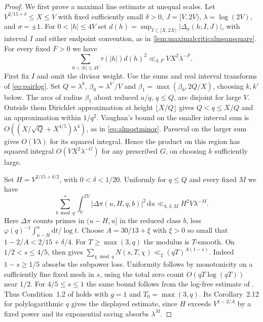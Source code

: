 \documentclass[11pt,a4paper]{article}
\numberwithin{equation}{section}
\newcommand{\ud}{\mathrm d}
\begin{document}
\begin{proof}
We first prove a maximal line estimate at unequal scales. Let
$V^{2/15+\delta}\le X\le V$ with fixed sufficiently small $\delta>0$,
$J=[V,2V)$, $\lambda=\log(2V)$, and $\sigma=\pm1$. For
$0<|h|\le4V$ set
$d(h)=\sup_{I\subset[X,2X)}|\Delta_\sigma(h;I,J)|$, with interval
$I$ and either endpoint convention, as in
\cref{lem:maximalcriticalmeansquare}. For every fixed $F>0$ we have
\begin{equation}
 \sum_{0<|h|\le4V} \tau(|h|)d(h)^2
           \ll_{\delta,F}VX^2\lambda^{-F}.
 \label{eq:unequal-uncond-max}
\end{equation}
First fix $I$ and omit the divisor weight. Use the sums and real
interval transforms of \cref{eq:pairlog}. Set $Q=\lambda^k$,
$\beta_0=\lambda^{k'}/V$ and
$\beta_1=\max(\beta_0,2Q/X)$, choosing $k,k'$ below. The arcs of
radius $\beta_1$ about reduced $a/q$, $q\le Q$, are disjoint for
large $V$. Outside them Dirichlet approximation at height
$\lfloor X/Q\rfloor$ gives $Q<q\le X/Q$ and an approximation
within $1/q^2$. Vaughan's bound on the smaller interval sum is
$O((X/\sqrt Q+X^{4/5})\lambda^4)$, as in \cref{eq:almostminor}.
Parseval on the larger sum gives $O(V\lambda)$ for its squared
integral. Hence the product on this region has squared integral
$O(VX^2\lambda^{-G})$ for any prescribed $G$, on choosing $k$
sufficiently large.

Set $H=V^{2/15+\delta/2}$, with $0<\delta<1/20$. Uniformly for
$q\le Q$ and every fixed $M$ we have
\[
 \sum_{b\bmod q}^{*}\int_V^{2V}|\Delta\pi(u,H,q,b)|^2\,\ud u
       \ll_{k,\delta,M} H^2V\lambda^{-M}.
\]
Here $\Delta\pi$ counts primes in $(u-H,u]$ in the reduced
class $b$, less $\varphi(q)^{-1}\int_{u-H}^u\ud t/\log t$.
Choose $A=30/13+\xi$ with $\xi>0$ so small that
$1-2/A<2/15+\delta/4$. For $T\ge\max(3,q)$ the modulus is
$T$-smooth. On $1/2<s\le4/5$, \cite[Theorem~1.2]{ChenGuptaLi}
then gives $\sum_{\chi\bmod q}N(s,T,\chi)\ll_\xi(qT)^{A(1-s)}$.
Indeed $1-s\ge1/5$ absorbs the subpower loss. Uniformity follows
by monotonicity on a sufficiently fine fixed mesh in $s$, using
the total zero count $O(qT\log(qT))$ near $1/2$.
For $4/5\le s\le1$ the same bound follows from the log-free
estimate of \cite[Theorem~1, (1.7)]{JutilaLinnik}.
Thus Condition~1.2 of \cite{HarmShortAP} holds with $g=1$ and
$T_0=\max(3,q)$. Its Corollary~2.12 for polylogarithmic $q$
gives the displayed estimate, since $H$ exceeds $V^{1-2/A}$ by
a fixed power and its exponential saving absorbs $\lambda^M$.


\end{proof}
\end{document}
